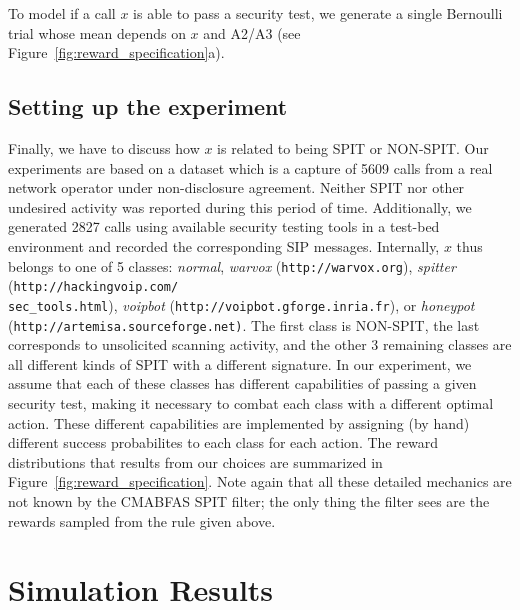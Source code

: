 \documentclass{llncs}
\begin{document}
To model if a call $x$ is able to pass a security test, we generate a single Bernoulli trial whose mean
depends on $x$ and A2/A3 (see Figure~\ref{fig:reward_specification}a).



\subsection{Setting up the experiment}
Finally, we have to discuss how $x$ is related to being SPIT or NON-SPIT. 
Our experiments are based on a dataset which is a capture of 5609 calls from 
a real network operator under non-disclosure agreement. Neither SPIT nor 
other undesired activity was reported during this period of time. Additionally, we 
generated 2827 calls using available security testing tools in a test-bed environment 
and recorded the corresponding SIP messages. Internally, $x$ thus belongs to one of 5 
classes: {\em normal}, {\em warvox} ({\tt http://warvox.org}), {\em spitter} ({\tt http://hackingvoip.com/\\sec\_tools.html}), 
{\em voipbot} ({\tt http://voipbot.gforge.inria.fr}), or {\em honeypot} \\({\tt http://artemisa.sourceforge.net)}. 
The first class is NON-SPIT, the last corresponds to unsolicited scanning activity, and 
the other 3 remaining classes are all different kinds of SPIT with a different signature. 
In our experiment, we assume that each of these classes has different capabilities of passing a given 
security test, making it necessary to combat each class with a different optimal action. These different
capabilities are implemented by assigning (by hand) different success probabilites to each class for 
each action. The reward distributions that results from our choices are summarized in Figure~\ref{fig:reward_specification}. 
Note again that all these detailed mechanics are not known by the CMABFAS SPIT filter; the only thing the filter sees are 
the rewards sampled from the rule given above. 


\section{Simulation Results}
\label{sec:results}
\end{document}
